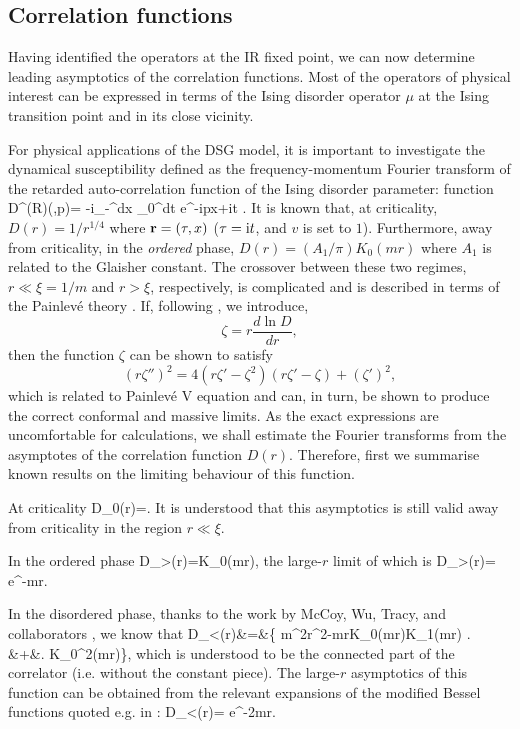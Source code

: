 \subsection{Correlation functions}

Having identified the operators at the IR fixed point,
we can now determine leading asymptotics of the correlation functions.
Most of the operators of physical interest
can be expressed in terms of the Ising disorder
operator $\mu$ at the Ising transition point 
and in its close vicinity. 

For physical applications of the DSG model, it is
important to investigate the dynamical susceptibility 
defined as the frequency-momentum Fourier transform
of the retarded auto-correlation function of the Ising
disorder parameter:
function
\be
D^{(R)}(\omega,p)= -i\int_{-\infty}^\infty dx
\int_0^\infty dt e^{-ipx+i\omega t}
\la\left[\mu(x,t),\mu(0,0)\right]\ra.
\label{ret}
\ee
It is known that,
at criticality, $D(r)= 1/r^{1/4}$ where 
${\bf r}=(\tau,x)$ ($\tau =\mbox{i} t$, 
and $v$ is set to $1$). Furthermore,
away from criticality, in the
{\it ordered} phase, $D(r)=(A_1/\pi)K_0(mr)$
where $A_1$ is related to the Glaisher
constant. The crossover between these two regimes,
$r\ll \xi=1/m$ and $r> \xi$, respectively, 
is complicated and is described in terms
of the Painlev\'{e} theory \cite{MC}. 
If, following \cite{MC}, we introduce,
\[
\zeta=r \frac{d\ln D}{dr},
\]
then the function $\zeta$ can be shown to satisfy
\[
(r\zeta'')^2=
4(r\zeta'-\zeta^2)(r\zeta'-\zeta)+(\zeta')^2,
\]
which is related to Painlev\'{e} V equation and can,
in turn,
be shown to produce the correct conformal and massive
limits.
As the exact expressions are uncomfortable 
for calculations, we shall estimate the
Fourier transforms from the asymptotes of the
correlation function $D(r)$.
 Therefore, first we summarise known
results on the limiting behaviour of this function.

At criticality
\be
D_0(r)=.
\label{Dnot}
\ee
It is understood that this asymptotics is still valid 
away from criticality in the region $r\ll\xi$.

In the ordered phase 
\be
D_>(r)=K_0(mr),
\label{Dord}
\ee
the large-$r$ limit of which is
\be
D_>(r)=
e^{-mr}.
\label{Dordas}
\ee

In the disordered phase, thanks to
the work by McCoy, Wu, Tracy, and collaborators \cite{MC},
we know that
\bea
D_<(r)&=&\left\{
m^2r^2\left[K_1^2(mr)-K_0^2(mr)\right]-mrK_0(mr)K_1(mr)
\nonumber\right.\\&+&\left.
K_0^2(mr)\right\},
\label{Ddis}
\eea
which is understood to be the connected part of the
correlator
(i.e. without the constant piece). The large-$r$
asymptotics
of this function can be obtained from the relevant expansions
of the modified Bessel functions quoted e.g. in \cite{GNT}:
\be
D_<(r)=
e^{-2mr}.
\label{Ddisas}
\ee

